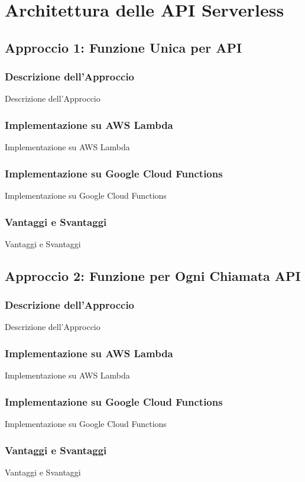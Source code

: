 \documentclass[12pt,a4paper,twoside]{book}
\begin{document}
\chapter{Architettura delle API Serverless}
\section{Approccio 1: Funzione Unica per API}
\subsection{Descrizione dell’Approccio}
Descrizione dell’Approccio

\subsection{Implementazione su AWS Lambda}
Implementazione su AWS Lambda

\subsection{Implementazione su Google Cloud Functions}
Implementazione su Google Cloud Functions

\subsection{Vantaggi e Svantaggi}
Vantaggi e Svantaggi

\section{Approccio 2: Funzione per Ogni Chiamata API}
\subsection{Descrizione dell’Approccio}
Descrizione dell’Approccio

\subsection{Implementazione su AWS Lambda}
Implementazione su AWS Lambda

\subsection{Implementazione su Google Cloud Functions}
Implementazione su Google Cloud Functions

\subsection{Vantaggi e Svantaggi}
Vantaggi e Svantaggi
\end{document}
